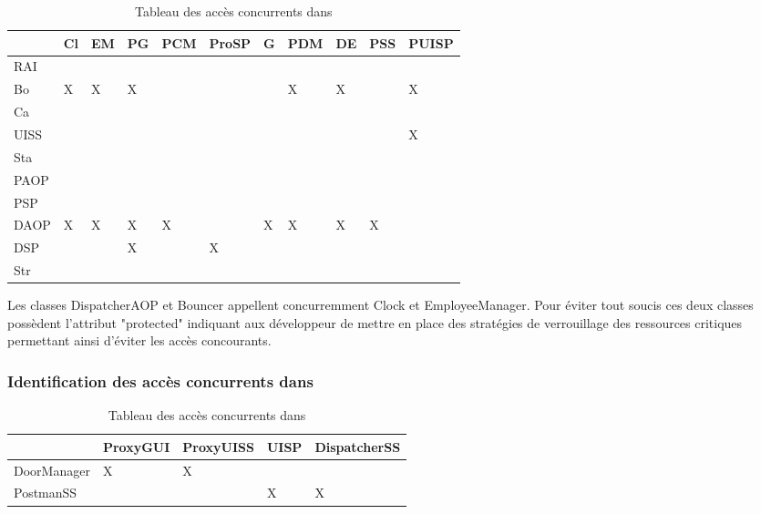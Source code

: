 \begin{table}[H]
    \centering
    \begin{tabularx}{\textwidth}{|X|X|X|X|X|X|X|X|X|X|X|}
      \hline 
            & Cl & EM & PG & PCM & ProSP & G & PDM & DE & PSS & PUISP \\ 
        \hline
            RAI  &   &   &   &   &   &   &   &   &   &      \\ 
        \hline
            Bo   & X & X & X  &   &   &   & X  & X &   & X     \\ 
        \hline
            Ca   &   &   &   &   &  &   &   &   &   &    \\ 
        \hline
            UISS &   &   &   &   &   &   &   &   &   &  X  \\ 
        \hline
            Sta  &   &   &   &   &   &   &   &   &   &    \\ 
        \hline                                  
            PAOP &   &   &   &   &   &   &   &   &   &      \\ 
        \hline
            PSP  &   &   &   &   &   &   &   &   &   &    \\ 
        \hline
            DAOP & X & X &  X & X &   & X & X & X  & X &    \\ 
        \hline
            DSP  &   &   & X &   & X  &   &   &   &   &    \\ 
        \hline
            Str  &   &   &  &   &   &   &   &   &   &    \\ 
        \hline
    \end{tabularx}
    \caption{Tableau des accès concurrents dans \appliLin}
    \label{tableau-acces-concurrents-1}
  \end{table}

  Les classes DispatcherAOP et Bouncer appellent concurremment Clock et EmployeeManager.
  Pour éviter tout soucis ces deux classes possèdent l'attribut "protected" indiquant aux développeur de mettre en place des stratégies de verrouillage des ressources critiques permettant ainsi d'éviter les accès concourants.
  

\subsubsection{Identification des accès concurrents dans \appliPo}%

\begin{table}[H]
  \centering
  \begin{tabularx}{\textwidth}{|X|X|X|X|X|}
    \hline 
                        & ProxyGUI  & ProxyUISS & UISP  & DispatcherSS  \\ 
      \hline
          DoorManager   &     X     &     X     &       &               \\ 
      \hline
          PostmanSS     &           &           &   X   &       X       \\ 
      \hline
  \end{tabularx}
  \caption{Tableau des accès concurrents dans \appliPo}
  \label{tableau-acces-concurrents-2}
\end{table}

